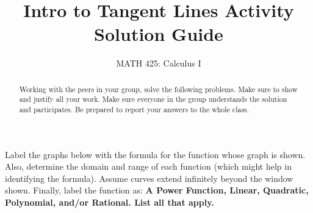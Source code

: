 \documentclass{ximera}
\title{Intro to Tangent Lines Activity Solution Guide}
\author{MATH 425: Calculus I}
\begin{document}
\begin{abstract}
    Working with the peers in your group, solve the following problems. Make sure to show and justify all your work. Make sure everyone in the group understands the solution and participates. Be prepared to report your answers to the whole class. 
\end{abstract}
\maketitle


\begin{exercise}
Label the graphs below with the formula for the function whose graph is shown. Also, determine the domain and range of each function (which might help in identifying the formula). Assume curves extend infinitely beyond the window shown. Finally, label the function as: \textbf{A Power Function, Linear, Quadratic, Polynomial, and/or Rational. List all that apply.}


\end{exercise}
\end{document}
